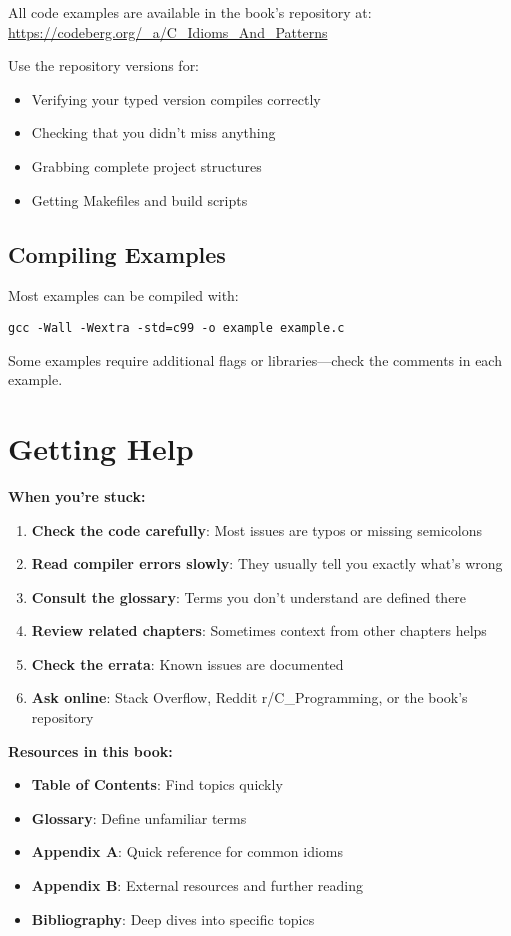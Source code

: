 \documentclass[11pt,openany]{book}
\begin{document}
All code examples are available in the book's repository at:
\url{https://codeberg.org/_a/C_Idioms_And_Patterns}

Use the repository versions for:
\begin{itemize}
    \item Verifying your typed version compiles correctly
    \item Checking that you didn't miss anything
    \item Grabbing complete project structures
    \item Getting Makefiles and build scripts
\end{itemize}

\subsection*{Compiling Examples}

Most examples can be compiled with:
\begin{verbatim}
gcc -Wall -Wextra -std=c99 -o example example.c
\end{verbatim}

Some examples require additional flags or libraries—check the comments in each example.

\section*{Getting Help}

\textbf{When you're stuck:}

\begin{enumerate}
    \item \textbf{Check the code carefully}: Most issues are typos or missing semicolons
    \item \textbf{Read compiler errors slowly}: They usually tell you exactly what's wrong
    \item \textbf{Consult the glossary}: Terms you don't understand are defined there
    \item \textbf{Review related chapters}: Sometimes context from other chapters helps
    \item \textbf{Check the errata}: Known issues are documented
    \item \textbf{Ask online}: Stack Overflow, Reddit r/C\_Programming, or the book's repository
\end{enumerate}

\textbf{Resources in this book:}
\begin{itemize}
    \item \textbf{Table of Contents}: Find topics quickly
    \item \textbf{Glossary}: Define unfamiliar terms
    \item \textbf{Appendix A}: Quick reference for common idioms
    \item \textbf{Appendix B}: External resources and further reading
    \item \textbf{Bibliography}: Deep dives into specific topics
\end{itemize}
\end{document}
